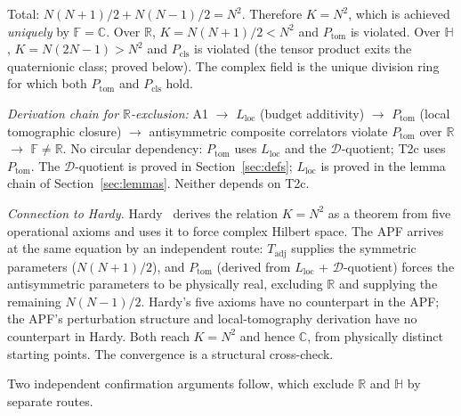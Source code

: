 \documentclass[11pt]{article}
\theoremstyle{remark}
\begin{document}
\begin{tcolorbox}[apfbox, title={T2c: Selection of the Complex Branch}]
Total: $N(N+1)/2 + N(N-1)/2 = N^2$.  Therefore $K = N^2$, which is achieved \emph{uniquely} by $\mathbb{F} = \mathbb{C}$.  Over $\mathbb{R}$, $K = N(N+1)/2 < N^2$ and $P_{\mathrm{tom}}$ is violated.  Over $\mathbb{H}$, $K = N(2N-1) > N^2$ and $P_{\mathrm{cls}}$ is violated (the tensor product exits the quaternionic class; proved below).  The complex field is the unique division ring for which both $P_{\mathrm{tom}}$ and $P_{\mathrm{cls}}$ hold.

\smallskip\noindent\textit{Derivation chain for $\mathbb{R}$-exclusion:} A1 $\to$ $L_{\mathrm{loc}}$ (budget additivity) $\to$ $P_{\mathrm{tom}}$ (local tomographic closure) $\to$ antisymmetric composite correlators violate $P_{\mathrm{tom}}$ over $\mathbb{R}$ $\to$ $\mathbb{F} \ne \mathbb{R}$.  No circular dependency: $P_{\mathrm{tom}}$ uses $L_{\mathrm{loc}}$ and the $\mathcal{D}$-quotient; T2c uses $P_{\mathrm{tom}}$.  The $\mathcal{D}$-quotient is proved in Section~\ref{sec:defs}; $L_{\mathrm{loc}}$ is proved in the lemma chain of Section~\ref{sec:lemmas}.  Neither depends on T2c.

\smallskip\noindent\textit{Connection to Hardy.}  Hardy~\cite{Hardy2001} derives the relation $K = N^2$ as a theorem from five operational axioms and uses it to force complex Hilbert space.  The APF arrives at the same equation by an independent route: $T_{\mathrm{adj}}$ supplies the symmetric parameters ($N(N+1)/2$), and $P_{\mathrm{tom}}$ (derived from $L_{\mathrm{loc}}$ + $\mathcal{D}$-quotient) forces the antisymmetric parameters to be physically real, excluding $\mathbb{R}$ and supplying the remaining $N(N-1)/2$.  Hardy's five axioms have no counterpart in the APF; the APF's perturbation structure and local-tomography derivation have no counterpart in Hardy.  Both reach $K = N^2$ and hence $\mathbb{C}$, from physically distinct starting points.  The convergence is a structural cross-check.
\end{tcolorbox}

\noindent Two independent confirmation arguments follow, which exclude $\mathbb{R}$ and $\mathbb{H}$ by separate routes.
\end{document}
